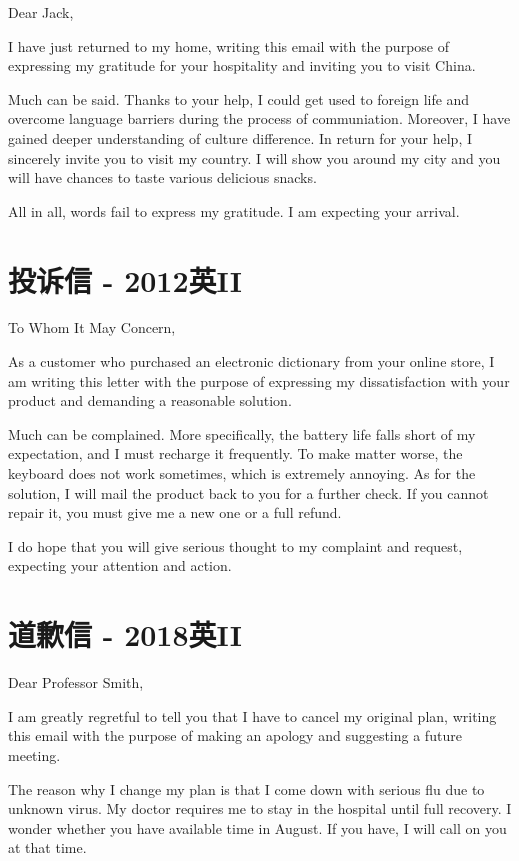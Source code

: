\noindent Dear Jack,

I have just returned to my home, writing this email with the purpose of expressing my 
gratitude for your hospitality and inviting you to visit China.

Much can be said. Thanks to your help, I could get used to foreign life and 
overcome language barriers during the process of communiation. 
Moreover, I have gained deeper understanding of culture difference. 
In return for your help, I sincerely invite you to visit my country. 
I will show you around my city and you will have chances to taste various
delicious snacks.

All in all, words fail to express my gratitude. I am expecting your arrival.

\YSLM

\section{投诉信 - 2012英II}

\noindent To Whom It May Concern,

As a customer who purchased an electronic dictionary from your online store,
I am writing this letter with the purpose of expressing my dissatisfaction
with your product and demanding a reasonable solution.

Much can be complained. More specifically, the battery life falls short of 
my expectation, and I must recharge it frequently. To make matter worse, the
keyboard does not work sometimes, which is extremely annoying. 
As for the solution, I will mail the product back to you for a further check.
If you cannot repair it, you must give me a new one or a full refund.

I do hope that you will give serious thought to my complaint and request,
expecting your attention and action. 



\section{道歉信 - 2018英II}

\noindent Dear Professor Smith,

I am greatly regretful to tell you that I have to cancel my original plan, 
writing this email with the purpose of making an apology and suggesting a future meeting.

The reason why I change my plan is that I come down with serious flu due to unknown virus.
My doctor requires me to stay in the hospital until full recovery. I wonder whether you have 
available time in August. If you have, I will call on you at that time. 

